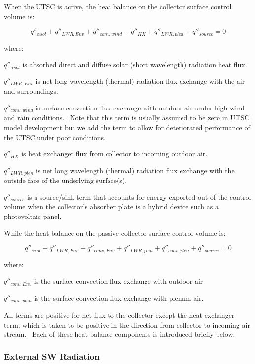 When the UTSC is active, the heat balance on the collector surface control volume is:

\begin{equation}
{q''_{\alpha sol}} + {q''_{LWR,Env}} + {q''_{conv,wind}} - {q''_{HX}} + {q''_{LWR,plen}} + {q''_{source}} = 0
\label{eq:SolarCollectorHeatBalance718}
\end{equation}

where:

\(q''_{\alpha sol}\) is absorbed direct and diffuse solar (short wavelength) radiation heat flux.

\({q''_{LWR,Env}}\) is net long wavelength (thermal) radiation flux exchange with the air and surroundings.

\({q''_{conv,wind}}\) is surface convection flux exchange with outdoor air under high wind and rain conditions.~ Note that this term is usually assumed to be zero in UTSC model development but we add the term to allow for deteriorated performance of the UTSC under poor conditions.

\(q''_{HX}\) is heat exchanger flux from collector to incoming outdoor air.

\(q''_{LWR,plen}\) is net long wavelength (thermal) radiation flux exchange with the outside face of the underlying surface(s).

\({q''_{source}}\) is a source/sink term that accounts for energy exported out of the control volume when the collector's absorber plate is a hybrid device such as a photovoltaic panel.

While the heat balance on the passive collector surface control volume is:

\begin{equation}
{q''_{\alpha sol}} + {q''_{LWR,Env}} + {q''_{conv,Env}} + {q''_{LWR,plen}} + {q''_{conv,plen}} + {q''_{source}} = 0
\end{equation}

where:

\(q''_{conv,Env}\) is the surface convection flux exchange with outdoor air

\(q''_{conv,plen}\) is the surface convection flux exchange with plenum air.

All terms are positive for net flux to the collector except the heat exchanger term, which is taken to be positive in the direction from collector to incoming air stream.~ Each of these heat balance components is introduced briefly below.

\subsubsection{External SW Radiation}\label{external-sw-radiation-000}

